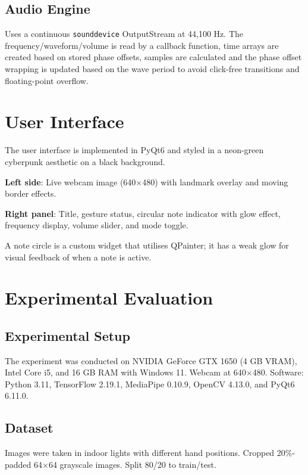 \documentclass[conference]{IEEEtran}
\begin{document}
\subsection{Audio Engine}

Uses a continuous \texttt{sounddevice} OutputStream at 44,100 Hz. The frequency/waveform/volume is read by a callback function, time arrays are created based on stored phase offsets, samples are calculated and the phase offset wrapping is updated based on the wave period to avoid click-free transitions and floating-point overflow.

\section{User Interface}

The user interface is implemented in PyQt6 and styled in a neon-green cyberpunk aesthetic on a black background.

\textbf{Left side}: Live webcam image (640$\times$480) with landmark overlay and moving border effects.

\textbf{Right panel}: Title, gesture status, circular note indicator with glow effect, frequency display, volume slider, and mode toggle.

A note circle is a custom widget that utilises QPainter; it has a weak glow for visual feedback of when a note is active.

\section{Experimental Evaluation}

\subsection{Experimental Setup}

The experiment was conducted on NVIDIA GeForce GTX 1650 (4 GB VRAM), Intel Core i5, and 16 GB RAM with Windows 11. Webcam at 640$\times$480. Software: Python 3.11, TensorFlow 2.19.1, MediaPipe 0.10.9, OpenCV 4.13.0, and PyQt6 6.11.0.

\subsection{Dataset}

Images were taken in indoor lights with different hand positions. Cropped 20\%-padded 64$\times$64 grayscale images. Split 80/20 to train/test.
\end{document}
